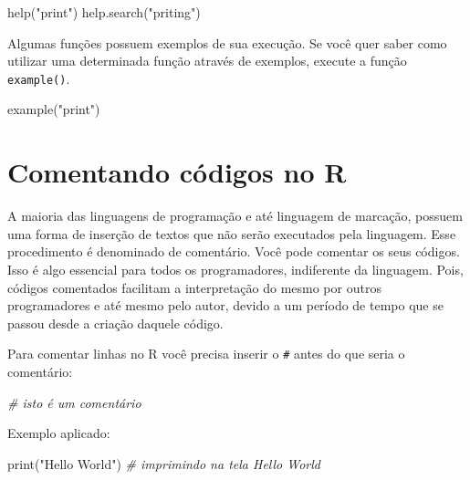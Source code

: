 \documentclass[
]{book}
\newenvironment{Shaded}{\begin{snugshade}}{\end{snugshade}}
\newcommand{\CommentTok}[1]{\textcolor[rgb]{0.56,0.35,0.01}{\textit{#1}}}
\newcommand{\FunctionTok}[1]{\textcolor[rgb]{0.00,0.00,0.00}{#1}}
\newcommand{\NormalTok}[1]{#1}
\newcommand{\StringTok}[1]{\textcolor[rgb]{0.31,0.60,0.02}{#1}}
\begin{document}
\begin{Shaded}
\begin{Highlighting}[]
\FunctionTok{help}\NormalTok{(}\StringTok{"print"}\NormalTok{)}
\FunctionTok{help.search}\NormalTok{(}\StringTok{"priting"}\NormalTok{)}
\end{Highlighting}
\end{Shaded}

Algumas funções possuem exemplos de sua execução. Se você quer saber como utilizar uma determinada função através de exemplos, execute a função \texttt{example()}.

\begin{Shaded}
\begin{Highlighting}[]
\FunctionTok{example}\NormalTok{(}\StringTok{"print"}\NormalTok{)}
\end{Highlighting}
\end{Shaded}

\hypertarget{comentando-cuxf3digos-no-r}{%
\section{Comentando códigos no R}\label{comentando-cuxf3digos-no-r}}

A maioria das linguagens de programação e até linguagem de marcação, possuem uma forma de inserção de textos que não serão executados pela linguagem. Esse procedimento é denominado de comentário. Você pode comentar os seus códigos. Isso é algo essencial para todos os programadores, indiferente da linguagem. Pois, códigos comentados facilitam a interpretação do mesmo por outros programadores e até mesmo pelo autor, devido a um período de tempo que se passou desde a criação daquele código.

Para comentar linhas no R você precisa inserir o \texttt{\#} antes do que seria o comentário:

\begin{Shaded}
\begin{Highlighting}[]
\CommentTok{\# isto é um comentário}
\end{Highlighting}
\end{Shaded}

Exemplo aplicado:

\begin{Shaded}
\begin{Highlighting}[]
\FunctionTok{print}\NormalTok{(}\StringTok{"Hello World"}\NormalTok{) }\CommentTok{\# imprimindo na tela Hello World}
\end{Highlighting}
\end{Shaded}
\end{document}
